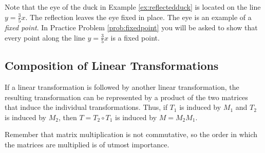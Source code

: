 \documentclass{ximera}
\newcommand{\RR}{\mathbb{R}}
\newcommand{\dfn}{\textit}
\begin{document}
Note that the eye of the duck in Example \ref{ex:reflectedduck} is located on the line $y=\frac{3}{5}x$.  The reflection leaves the eye fixed in place.  The eye is an example of a \dfn{fixed point}.  In Practice Problem \ref{prob:fixedpoint} you will be asked to show that every point along the line $y=\frac{3}{5}x$ is a fixed point.

\subsection*{Composition of Linear Transformations}

If a linear transformation is followed by another linear transformation, the resulting transformation can be represented by a product of the two matrices that induce the individual transformations.  Thus, if $T_1$ is induced by $M_1$ and $T_2$ is induced by $M_2$, then $T=T_2\circ T_1$ is induced by $M=M_2M_1$.

\begin{center}
\end{center}

Remember that matrix multiplication is not commutative, so the order in which the matrices are multiplied is of utmost importance.
\end{document}
